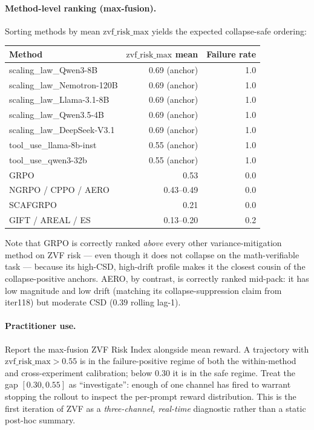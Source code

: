 \paragraph{Method-level ranking (max-fusion).} Sorting methods by mean
$\mathrm{zvf\_risk\_max}$ yields the expected collapse-safe ordering:
\begin{center}
\small
\begin{tabular}{lrr}
\hline
Method & $\mathrm{zvf\_risk\_max}$ mean & Failure rate \\
\hline
scaling\_law\_Qwen3-8B        & 0.69 (anchor) & 1.0 \\
scaling\_law\_Nemotron-120B   & 0.69 (anchor) & 1.0 \\
scaling\_law\_Llama-3.1-8B    & 0.69 (anchor) & 1.0 \\
scaling\_law\_Qwen3.5-4B      & 0.69 (anchor) & 1.0 \\
scaling\_law\_DeepSeek-V3.1   & 0.69 (anchor) & 1.0 \\
tool\_use\_llama-8b-inst      & 0.55 (anchor) & 1.0 \\
tool\_use\_qwen3-32b          & 0.55 (anchor) & 1.0 \\
GRPO                          & 0.53          & 0.0 \\
NGRPO / CPPO / AERO           & 0.43--0.49    & 0.0 \\
SCAFGRPO                      & 0.21          & 0.0 \\
GIFT / AREAL / ES             & 0.13--0.20    & 0.2 \\
\hline
\end{tabular}
\end{center}
Note that GRPO is correctly ranked \emph{above} every other
variance-mitigation method on ZVF risk --- even though it does not
collapse on the math-verifiable task --- because its high-CSD,
high-drift profile makes it the closest cousin of the
collapse-positive anchors. AERO, by contrast, is correctly ranked
mid-pack: it has low magnitude and low drift (matching its
collapse-suppression claim from iter118) but moderate CSD ($0.39$
rolling lag-1).

\paragraph{Practitioner use.} Report the max-fusion ZVF Risk Index
alongside mean reward. A trajectory with
$\mathrm{zvf\_risk\_max} > 0.55$ is in the failure-positive regime of
both the within-method and cross-experiment calibration; below
$0.30$ it is in the safe regime. Treat the gap $[0.30, 0.55]$ as
``investigate'': enough of one channel has fired to warrant stopping
the rollout to inspect the per-prompt reward distribution. This is the
first iteration of ZVF as a \emph{three-channel, real-time} diagnostic
rather than a static post-hoc summary.

